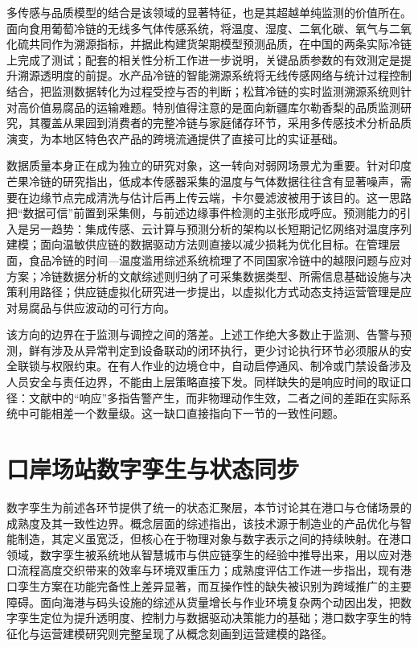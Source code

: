 \documentclass[11pt,a4paper]{article}
\begin{document}
多传感与品质模型的结合是该领域的显著特征，也是其超越单纯监测的价值所在。面向食用葡萄冷链的无线多气体传感系统，将温度、湿度、二氧化碳、氧气与二氧化硫共同作为溯源指标，并据此构建货架期模型预测品质，在中国的两条实际冷链上完成了测试\cite{doijcompag201612019}；配套的相关性分析工作进一步说明，关键品质参数的有效测定是提升溯源透明度的前提\cite{doijfoodcont201611019}。水产品冷链的智能溯源系统将无线传感网络与统计过程控制结合，把监测数据转化为过程受控与否的判断\cite{doijfpp12730}；松茸冷链的实时监测溯源系统则针对高价值易腐品的运输难题\cite{doielectronics8040423}。特别值得注意的是面向新疆库尔勒香梨的品质监测研究，其覆盖从果园到消费者的完整冷链与家庭储存环节，采用多传感技术分析品质演变，为本地区特色农产品的跨境流通提供了直接可比的实证基础\cite{doiapp9183895}。

数据质量本身正在成为独立的研究对象，这一转向对弱网场景尤为重要。针对印度芒果冷链的研究指出，低成本传感器采集的温度与气体数据往往含有显著噪声，需要在边缘节点完成清洗与估计后再上传云端，卡尔曼滤波被用于该目的\cite{doii2ct5429120229825458}。这一思路把“数据可信”前置到采集侧，与前述边缘事件检测的主张形成呼应。预测能力的引入是另一趋势：集成传感、云计算与预测分析的架构以长短期记忆网络对温度序列建模\cite{doiic3it66137202511341494}；面向温敏供应链的数据驱动方法则直接以减少损耗为优化目标\cite{doiejlpscm2013vol14n16874}。在管理层面，食品冷链的时间—温度滥用综述系统梳理了不同国家冷链中的越限问题与应对方案\cite{doijfoodcont201801027}；冷链数据分析的文献综述则归纳了可采集数据类型、所需信息基础设施与决策利用路径\cite{doiijlm0320170059}；供应链虚拟化研究进一步提出，以虚拟化方式动态支持运营管理是应对易腐品与供应波动的可行方向\cite{doijjfoodeng201511009}。

该方向的边界在于监测与调控之间的落差。上述工作绝大多数止于监测、告警与预测，鲜有涉及从异常判定到设备联动的闭环执行，更少讨论执行环节必须服从的安全联锁与权限约束。在有人作业的边境仓中，自动启停通风、制冷或门禁设备涉及人员安全与责任边界，不能由上层策略直接下发。同样缺失的是响应时间的取证口径：文献中的“响应”多指告警产生，而非物理动作生效，二者之间的差距在实际系统中可能相差一个数量级。这一缺口直接指向下一节的一致性问题。

\section{口岸场站数字孪生与状态同步}

数字孪生为前述各环节提供了统一的状态汇聚层，本节讨论其在港口与仓储场景的成熟度及其一致性边界。概念层面的综述指出，该技术源于制造业的产品优化与智能制造，其定义虽宽泛，但核心在于物理对象与数字表示之间的持续映射\cite{doiaccess20202998358}。在港口领域，数字孪生被系统地从智慧城市与供应链孪生的经验中推导出来，用以应对港口流程高度交织带来的效率与环境双重压力\cite{doiaccess20233295495}；成熟度评估工作进一步指出，现有港口孪生方案在功能完备性上差异显著\cite{doipercomworkshops568332023}，而互操作性的缺失被识别为跨域推广的主要障碍\cite{doijsyst20233340422}。面向海港与码头设施的综述从货量增长与作业环境复杂两个动因出发，把数字孪生定位为提升透明度、控制力与数据驱动决策能力的基础\cite{dois10696023095159}；港口数字孪生的特征化与运营建模研究则完整呈现了从概念刻画到运营建模的路径\cite{doi9789180755726}。
\end{document}
